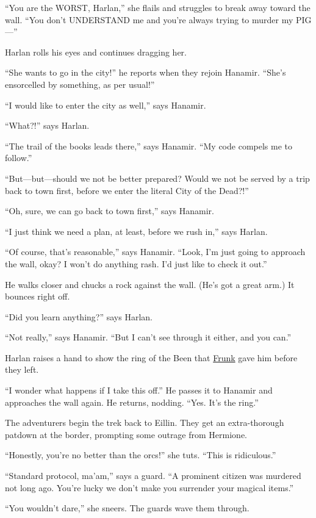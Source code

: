 \documentclass[smalldemyvopaper,11pt,twoside,onecolumn,openright,extrafontsizes]{memoir}
\begin{document}
``You are the WORST, Harlan,'' she flails and struggles to break away
toward the wall. ``You don't UNDERSTAND me and you're always trying to
murder my PIG---''

Harlan rolls his eyes and continues dragging her.

``She wants to go in the city!'' he reports when they rejoin Hanamir.
``She's ensorcelled by something, as per usual!''

``I would like to enter the city as well,'' says Hanamir.

``What?!'' says Harlan.

``The trail of the books leads there,'' says Hanamir. ``My code compels
me to follow.''

``But---but---should we not be better prepared? Would we not be served
by a trip back to town first, before we enter the literal City of the
Dead?!''

``Oh, sure, we can go back to town first,'' says Hanamir.

``I just think we need a plan, at least, before we rush in,'' says
Harlan.

``Of course, that's reasonable,'' says Hanamir. ``Look, I'm just going
to approach the wall, okay? I won't do anything rash. I'd just like to
check it out.''

He walks closer and chucks a rock against the wall. (He's got a great
arm.) It bounces right off.

``Did you learn anything?'' says Harlan.

``Not really,'' says Hanamir. ``But I can't see through it either, and
you can.''

Harlan raises a hand to show the ring of the Been that
\href{/characters/frunk/}{Frunk} gave him before they left.

``I wonder what happens if I take this off.'' He passes it to Hanamir
and approaches the wall again. He returns, nodding. ``Yes. It's the
ring.''

The adventurers begin the trek back to Eillin. They get an
extra-thorough patdown at the border, prompting some outrage from
Hermione.

``Honestly, you're no better than the orcs!'' she tuts. ``This is
ridiculous.''

``Standard protocol, ma'am,'' says a guard. ``A prominent citizen was
murdered not long ago. You're lucky we don't make you surrender your
magical items.''

``You wouldn't dare,'' she sneers. The guards wave them through.
\end{document}
